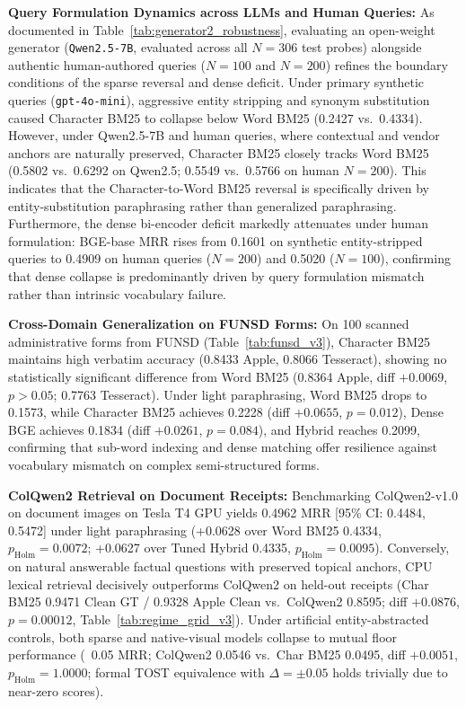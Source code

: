 \textbf{Query Formulation Dynamics across LLMs and Human Queries:} As documented in Table~\ref{tab:generator2_robustness}, evaluating an open-weight generator (\texttt{Qwen2.5-7B}, evaluated across all $N=306$ test probes) alongside authentic human-authored queries ($N=100$ and $N=200$) refines the boundary conditions of the sparse reversal and dense deficit. Under primary synthetic queries (\texttt{gpt-4o-mini}), aggressive entity stripping and synonym substitution caused Character BM25 to collapse below Word BM25 (0.2427 vs.\ 0.4334). However, under Qwen2.5-7B and human queries, where contextual and vendor anchors are naturally preserved, Character BM25 closely tracks Word BM25 (0.5802 vs.\ 0.6292 on Qwen2.5; 0.5549 vs.\ 0.5766 on human $N=200$). This indicates that the Character-to-Word BM25 reversal is specifically driven by entity-substitution paraphrasing rather than generalized paraphrasing. Furthermore, the dense bi-encoder deficit markedly attenuates under human formulation: BGE-base MRR rises from 0.1601 on synthetic entity-stripped queries to 0.4909 on human queries ($N=200$) and 0.5020 ($N=100$), confirming that dense collapse is predominantly driven by query formulation mismatch rather than intrinsic vocabulary failure.

\textbf{Cross-Domain Generalization on FUNSD Forms:} On 100 scanned administrative forms from FUNSD \cite{jaume2019funsd} (Table~\ref{tab:funsd_v3}), Character BM25 maintains high verbatim accuracy (0.8433 Apple, 0.8066 Tesseract), showing no statistically significant difference from Word BM25 (0.8364 Apple, diff $+0.0069$, $p > 0.05$; 0.7763 Tesseract). Under light paraphrasing, Word BM25 drops to 0.1573, while Character BM25 achieves 0.2228 (diff $+0.0655$, $p = 0.012$), Dense BGE achieves 0.1834 (diff $+0.0261$, $p = 0.084$), and Hybrid reaches 0.2099, confirming that sub-word indexing and dense matching offer resilience against vocabulary mismatch on complex semi-structured forms.

\textbf{ColQwen2 Retrieval on Document Receipts:} Benchmarking ColQwen2-v1.0 \cite{faysse2024colqwen2} on document images on Tesla T4 GPU yields 0.4962 MRR [95\% CI: 0.4484, 0.5472] under light paraphrasing (+0.0628 over Word BM25 0.4334, $p_{\text{Holm}} = 0.0072$; +0.0627 over Tuned Hybrid 0.4335, $p_{\text{Holm}} = 0.0095$). Conversely, on natural answerable factual questions with preserved topical anchors, CPU lexical retrieval decisively outperforms ColQwen2 on held-out receipts (Char BM25 0.9471 Clean GT / 0.9328 Apple Clean vs.\ ColQwen2 0.8595; diff $+0.0876$, $p = 0.00012$, Table~\ref{tab:regime_grid_v3}). Under artificial entity-abstracted controls, both sparse and native-visual models collapse to mutual floor performance (~0.05 MRR; ColQwen2 0.0546 vs.\ Char BM25 0.0495, diff $+0.0051$, $p_{\text{Holm}}=1.0000$; formal TOST equivalence with $\Delta=\pm 0.05$ holds trivially due to near-zero scores).

